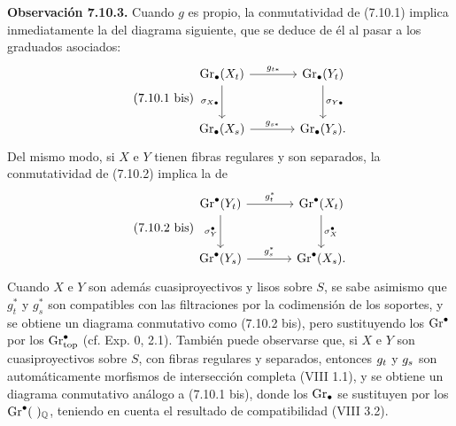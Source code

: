 \textbf{Observación 7.10.3.} Cuando \(g\) es propio, la conmutatividad de (7.10.1) implica inmediatamente la del diagrama siguiente, que se deduce de él al pasar a los graduados asociados:
\begin{equation}\tag{7.10.1 bis}
\begin{tikzcd}[column sep=large,row sep=large]
\Gr_\bullet(X_t) \arrow[r,"g_{t*}"] \arrow[d,"\sigma_{X\bullet}"'] &
\Gr_\bullet(Y_t) \arrow[d,"\sigma_{Y\bullet}"]\\
\Gr_\bullet(X_s) \arrow[r,"g_{s*}"] &
\Gr_\bullet(Y_s).
\end{tikzcd}
\end{equation}
Del mismo modo, si \(X\) e \(Y\) tienen fibras regulares y son separados, la conmutatividad de (7.10.2) implica la de
\begin{equation}\tag{7.10.2 bis}
\begin{tikzcd}[column sep=large,row sep=large]
\Gr^\bullet(Y_t) \arrow[r,"g_t^*"] \arrow[d,"\sigma_Y^\bullet"'] &
\Gr^\bullet(X_t) \arrow[d,"\sigma_X^\bullet"]\\
\Gr^\bullet(Y_s) \arrow[r,"g_s^*"] &
\Gr^\bullet(X_s).
\end{tikzcd}
\end{equation}
Cuando \(X\) e \(Y\) son además cuasiproyectivos y lisos sobre \(S\), se sabe asimismo que \(g_t^*\) y \(g_s^*\) son compatibles con las filtraciones por la codimensión de los soportes, y se obtiene un diagrama conmutativo como (7.10.2 bis), pero sustituyendo los \(\Gr^\bullet\) por los \(\Gr^\bullet_{\mathrm{top}}\) (cf. Exp. 0, 2.1). También puede observarse que, si \(X\) e \(Y\) son cuasiproyectivos sobre \(S\), con fibras regulares y separados, entonces \(\sisi{f_t}{g_t}\) y \(\sisi{f_s}{g_s}\) son automáticamente morfismos de intersección completa (VIII 1.1), y se obtiene un diagrama conmutativo análogo a (7.10.1 bis), donde los \(\Gr_\bullet\) se sustituyen por los \(\Gr^\bullet(\ )_{\mathbb Q}\), teniendo en cuenta el resultado de compatibilidad (VIII 3.2). %

